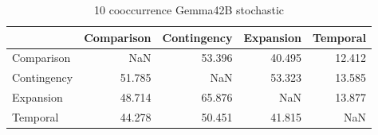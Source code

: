 \begin{table}
\caption{10 cooccurrence Gemma42B stochastic}
\begin{tabular}{lrrrr}
\toprule
 & Comparison & Contingency & Expansion & Temporal \\
\midrule
Comparison & NaN & 53.396 & 40.495 & 12.412 \\
Contingency & 51.785 & NaN & 53.323 & 13.585 \\
Expansion & 48.714 & 65.876 & NaN & 13.877 \\
Temporal & 44.278 & 50.451 & 41.815 & NaN \\
\bottomrule
\end{tabular}
\end{table}
